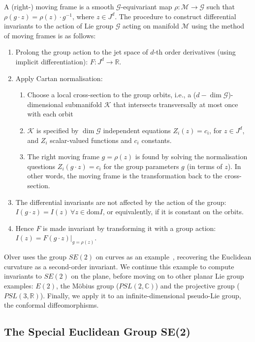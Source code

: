 \documentclass[review,onefignum,onetabnum]{siamonline190516}
\begin{document}
{A (right-) moving frame is a smooth $\mathcal{G}$-equivariant map $\rho : \mathcal{M} \to \mathcal{G}$ such that $\rho (g \cdot z) = \rho(z) \cdot g^{-1}$, where $z \in J^d$. The procedure to construct differential invariants to the action of Lie group $\mathcal{G}$ acting on manifold $\mathcal{M}$ using the method of moving frames is as follows:

\begin{enumerate}
\item Prolong the group action to the jet space of $d$-th order derivatives (using implicit differentiation): $F: J^d \to \mathbb{R}$. 
\item Apply Cartan normalisation:
    \begin{enumerate}
    \item Choose a local cross-section to the group orbits, i.e., a ($d - \dim \mathcal{G}$)-dimensional submanifold $\mathcal{K}$ that intersects transversally at most once with each orbit
    \item $\mathcal{K}$ is specified by $\dim \mathcal{G}$ independent equations $Z_i (z) = c_i$, for $z \in J^d$,  and $Z_i$ scalar-valued functions and $c_i$ constants.
    \item The right moving frame $g = \rho(z)$ is found by solving the normalisation questions $Z_i (g \cdot z) = c_i$ for the group parameters $g$ (in terms of $z$). In other words, the moving frame is the transformation back to the cross-section.
    \end{enumerate}
\item The differential invariants are not affected by the action of the group: $I(g \cdot z) = I(z) \: \forall z \in \mathrm{dom} I$, or equivalently, if it is constant on the orbits. 
\item Hence $F$ is made invariant by transforming it with a group action: $I(z) = F(g \cdot z) |_{g=\rho(z)}$.  
\end{enumerate}

Olver uses the group $SE(2)$ on curves as an example~\cite{Olver}, recovering the Euclidean curvature as a second-order invariant. We continue this example to compute invariants to $SE(2)$ on the plane, before moving on to other planar Lie group examples: $E(2)$, the M\"obius group ($PSL(2,\mathbb{C})$) and the projective group ($PSL(3,\mathbb{R})$). Finally, we apply it to an infinite-dimensional pseudo-Lie group, the conformal diffeomorphisms.

\subsection{The Special Euclidean Group SE(2)}

}
\end{document}
